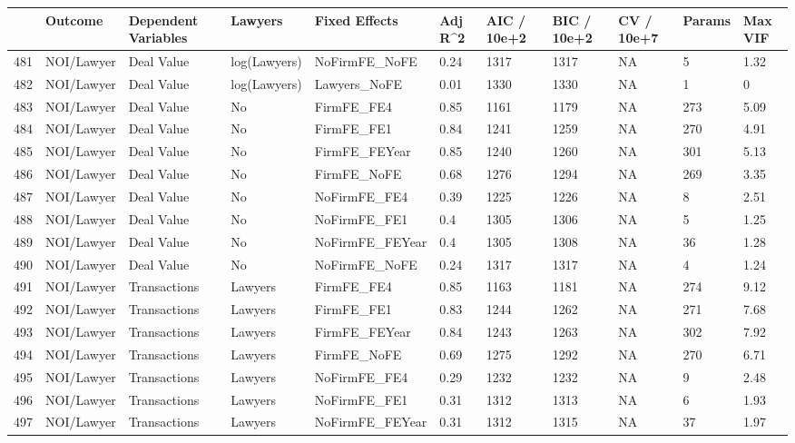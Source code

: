 \documentclass{article}
\begin{document}
\begin{table}[H]
\centering
\begin{tabular}{rllllllllll}
  \hline
 & Outcome & Dependent Variables & Lawyers & Fixed Effects & Adj R^2 & AIC / 10e+2 & BIC / 10e+2 & CV / 10e+7 & Params & Max VIF \\ 
  \hline
481 & NOI/Lawyer & Deal Value & log(Lawyers) & NoFirmFE\_NoFE & 0.24 & 1317 & 1317 & NA & 5 & 1.32 \\ 
  482 & NOI/Lawyer & Deal Value & log(Lawyers) & Lawyers\_NoFE & 0.01 & 1330 & 1330 & NA & 1 & 0 \\ 
  483 & NOI/Lawyer & Deal Value & No & FirmFE\_FE4 & 0.85 & 1161 & 1179 & NA & 273 & 5.09 \\ 
  484 & NOI/Lawyer & Deal Value & No & FirmFE\_FE1 & 0.84 & 1241 & 1259 & NA & 270 & 4.91 \\ 
  485 & NOI/Lawyer & Deal Value & No & FirmFE\_FEYear & 0.85 & 1240 & 1260 & NA & 301 & 5.13 \\ 
  486 & NOI/Lawyer & Deal Value & No & FirmFE\_NoFE & 0.68 & 1276 & 1294 & NA & 269 & 3.35 \\ 
  487 & NOI/Lawyer & Deal Value & No & NoFirmFE\_FE4 & 0.39 & 1225 & 1226 & NA & 8 & 2.51 \\ 
  488 & NOI/Lawyer & Deal Value & No & NoFirmFE\_FE1 & 0.4 & 1305 & 1306 & NA & 5 & 1.25 \\ 
  489 & NOI/Lawyer & Deal Value & No & NoFirmFE\_FEYear & 0.4 & 1305 & 1308 & NA & 36 & 1.28 \\ 
  490 & NOI/Lawyer & Deal Value & No & NoFirmFE\_NoFE & 0.24 & 1317 & 1317 & NA & 4 & 1.24 \\ 
  491 & NOI/Lawyer & Transactions & Lawyers & FirmFE\_FE4 & 0.85 & 1163 & 1181 & NA & 274 & 9.12 \\ 
  492 & NOI/Lawyer & Transactions & Lawyers & FirmFE\_FE1 & 0.83 & 1244 & 1262 & NA & 271 & 7.68 \\ 
  493 & NOI/Lawyer & Transactions & Lawyers & FirmFE\_FEYear & 0.84 & 1243 & 1263 & NA & 302 & 7.92 \\ 
  494 & NOI/Lawyer & Transactions & Lawyers & FirmFE\_NoFE & 0.69 & 1275 & 1292 & NA & 270 & 6.71 \\ 
  495 & NOI/Lawyer & Transactions & Lawyers & NoFirmFE\_FE4 & 0.29 & 1232 & 1232 & NA & 9 & 2.48 \\ 
  496 & NOI/Lawyer & Transactions & Lawyers & NoFirmFE\_FE1 & 0.31 & 1312 & 1313 & NA & 6 & 1.93 \\ 
  497 & NOI/Lawyer & Transactions & Lawyers & NoFirmFE\_FEYear & 0.31 & 1312 & 1315 & NA & 37 & 1.97 \\ 

\end{tabular}
\end{table}
\end{document}
